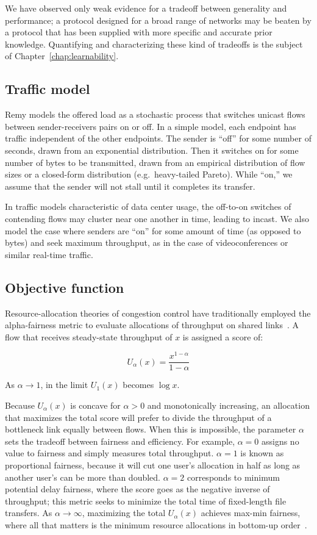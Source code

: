 We have observed only weak evidence for a tradeoff between generality
and performance; a protocol designed for a broad range of networks may
be beaten by a protocol that has been supplied with more specific and
accurate prior knowledge. Quantifying and characterizing these kind of
tradeoffs is the subject of Chapter~\ref{chap:learnability}.

\subsection{Traffic model}

Remy models the offered load as a stochastic process that switches
unicast flows between sender-receivers pairs on or off. In a simple
model, each endpoint has traffic independent of the other
endpoints. The sender is ``off'' for some number of seconds, drawn
from an exponential distribution. Then it switches on for some number
of bytes to be transmitted, drawn from an empirical distribution of
flow sizes or a closed-form distribution (e.g.~heavy-tailed
Pareto). While ``on,'' we assume that the sender will not stall until
it completes its transfer.

In traffic models characteristic of data center usage, the off-to-on
switches of contending flows may cluster near one another in time,
leading to incast. We also model the case where senders are ``on'' for
some amount of time (as opposed to bytes) and seek maximum throughput,
as in the case of videoconferences or similar real-time traffic.

\subsection{Objective function}

Resource-allocation theories of congestion control have traditionally
employed the alpha-fairness metric to evaluate allocations of
throughput on shared links~\cite{Srikant}. A flow that receives
steady-state throughput of $x$ is assigned a score of:

\begin{equation*}
U_\alpha(x) = \frac{x^{1-\alpha}}{1-\alpha}
\end{equation*}

As $\alpha \rightarrow 1$, in the limit $U_1(x)$ becomes $\log x$.

Because $U_\alpha(x)$ is concave for $\alpha > 0$ and monotonically
increasing, an allocation that maximizes the total score will prefer
to divide the throughput of a bottleneck link equally between
flows. When this is impossible, the parameter $\alpha$ sets the
tradeoff between fairness and efficiency. For example, $\alpha = 0$
assigns no value to fairness and simply measures total
throughput. $\alpha = 1$ is known as proportional fairness, because it
will cut one user's allocation in half as long as another user's can
be more than doubled. $\alpha = 2$ corresponds to minimum potential
delay fairness, where the score goes as the negative inverse of
throughput; this metric seeks to minimize the total time of
fixed-length file transfers. As $\alpha \rightarrow \infty$,
maximizing the total $U_\alpha(x)$ achieves max-min fairness, where
all that matters is the minimum resource allocations in bottom-up
order~\cite{Srikant}.

